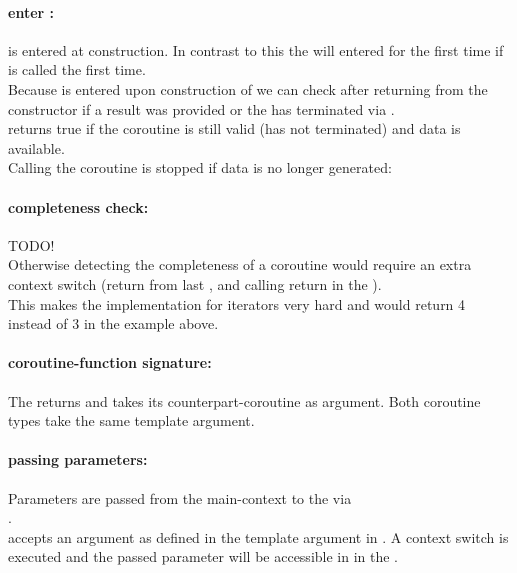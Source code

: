 \paragraph*{enter \corofunction:}
\corofunction is entered at \pullcoro construction. In contrast to this the
\corofunction will entered for the first time if \pushcoroop is called the first
time.\\
\newline
Because \corofunction is entered upon construction of \pullcoro we can check after
returning from the constructor if a result was provided or the \corofunction
has terminated via \pullcorobool.\\
\pullcorobool returns true if the coroutine is still valid (\corofunction has
not terminated) and data is available.\\
Calling the coroutine is stopped if data is no longer generated:

\paragraph*{completeness check:}
TODO!\\
Otherwise detecting the completeness of a coroutine would require an extra context
switch (return from last \pullcoroop, \pushcoroop and calling return in the \corofunction).\\
This makes the implementation for iterators very hard and 
would return 4 instead of 3 in the example above.

\paragraph*{coroutine-function signature:}
The \corofunction returns  and takes its counterpart-coroutine as argument.
Both coroutine types take the same template argument.\\

\paragraph*{passing parameters:}
Parameters are passed from the main-context to the \corofunction via\\\pushcoroop.\\
\newline
\pushcoroop accepts an argument as defined in the template argument in \pushcoro.
A context switch is executed and the passed parameter will be accessible in in
the \corofunction.

